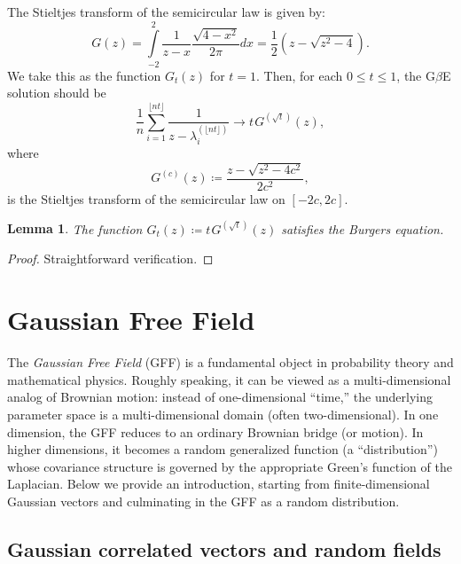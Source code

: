 \documentclass[letterpaper,11pt,oneside,reqno]{book}
\numberwithin{equation}{chapter}  %
\newcommand{\ssp}{\hspace{1pt}}
\newtheorem{lemma}[proposition]{Lemma}
\theoremstyle{definition}
\begin{document}
The Stieltjes transform of the semicircular law is given by:
\begin{equation*}
	G(z) = \int\limits_{-2}^{2}\frac{1}{z-x}\frac{\sqrt{4-x^2}}{2\pi}dx =
	\frac{1}{2} \left(z-\sqrt{z^2-4}\right).
\end{equation*}
We take this as the function $G_t(z)$ for $t=1$.
Then, for each $0\le t\le 1$, the
G$\beta$E solution should be
\begin{equation*}
	\frac{1}{n}\sum_{i=1}^{\lfloor nt \rfloor }\frac{1}{z-\lambda_i^{(\lfloor nt \rfloor )}}
	\to t\ssp G^{(\sqrt t)}(z),
\end{equation*}
where
\begin{equation*}
	G^{(c)}(z) \coloneqq \frac{z-\sqrt{z^2-4c^2}}{2c^2},
\end{equation*}
is the Stieltjes transform of the semicircular law on $[-2c, 2c]$.

\begin{lemma}
	\label{lecture9:lemma:semicircle_and_burgers}
	The function $G_t(z)\coloneqq t\ssp G^{(\sqrt t)}(z)$
	satisfies the Burgers equation.
\end{lemma}
\begin{proof}
	Straightforward verification.
\end{proof}



\section{Gaussian Free Field}
\label{lecture9:sec:GFF}

The \emph{Gaussian Free Field} (GFF) is a fundamental object in probability theory and mathematical physics. Roughly speaking, it can be viewed as a multi-dimensional analog of Brownian motion: instead of one-dimensional “time,” the underlying parameter space is a multi-dimensional domain (often two-dimensional). In one dimension, the GFF reduces to an ordinary Brownian bridge (or motion). In higher dimensions, it becomes a random generalized function (a “distribution”) whose covariance structure is governed by the appropriate Green's function of the Laplacian. Below we provide an introduction, starting from finite-dimensional Gaussian vectors and culminating in the GFF as a random distribution.

\subsection{Gaussian correlated vectors and random fields}
\label{lecture9:subsec:gauss_vectors_random_fields}
\end{document}
